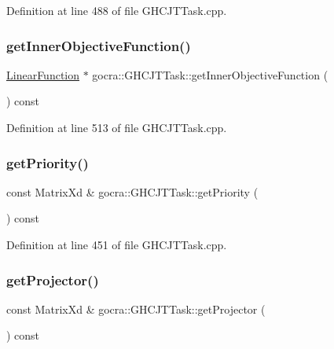 Definition at line 488 of file G\+H\+C\+J\+T\+Task.\+cpp.

\hypertarget{classgocra_1_1GHCJTTask_af38e11377a98b3adcdb9b4e47d55fae0}{}\label{classgocra_1_1GHCJTTask_af38e11377a98b3adcdb9b4e47d55fae0} 
\subsubsection{\texorpdfstring{get\+Inner\+Objective\+Function()}{getInnerObjectiveFunction()}}
{\footnotesize\ttfamily \hyperlink{classocra_1_1LinearFunction}{Linear\+Function} $\ast$ gocra\+::\+G\+H\+C\+J\+T\+Task\+::get\+Inner\+Objective\+Function (\begin{DoxyParamCaption}{ }\end{DoxyParamCaption}) const}



Definition at line 513 of file G\+H\+C\+J\+T\+Task.\+cpp.

\hypertarget{classgocra_1_1GHCJTTask_a3f9898bd47735158641a52ac36be2801}{}\label{classgocra_1_1GHCJTTask_a3f9898bd47735158641a52ac36be2801} 
\subsubsection{\texorpdfstring{get\+Priority()}{getPriority()}}
{\footnotesize\ttfamily const Matrix\+Xd \& gocra\+::\+G\+H\+C\+J\+T\+Task\+::get\+Priority (\begin{DoxyParamCaption}{ }\end{DoxyParamCaption}) const}



Definition at line 451 of file G\+H\+C\+J\+T\+Task.\+cpp.

\hypertarget{classgocra_1_1GHCJTTask_a666a371b1f2d20dcfd7d85a131c2c2df}{}\label{classgocra_1_1GHCJTTask_a666a371b1f2d20dcfd7d85a131c2c2df} 
\subsubsection{\texorpdfstring{get\+Projector()}{getProjector()}}
{\footnotesize\ttfamily const Matrix\+Xd \& gocra\+::\+G\+H\+C\+J\+T\+Task\+::get\+Projector (\begin{DoxyParamCaption}{ }\end{DoxyParamCaption}) const}



